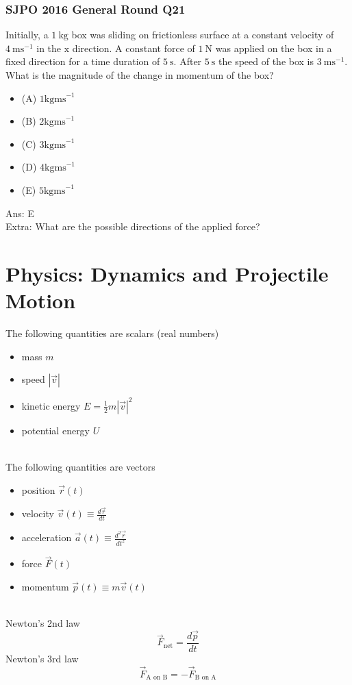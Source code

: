 \documentclass{article}
\begin{document}
\begin{samepage}
\subsubsection{SJPO 2016 General Round Q21}
Initially, a $1\mathrm{~kg}$ box was sliding on frictionless surface at a constant velocity of $4\mathrm{~ms}^{-1}$ in the $\mathrm{x}$ direction. A constant force of $1\mathrm{~N}$ was applied on the box in a fixed direction for a time duration of $5\mathrm{~s}$. After $5\mathrm{~s}$ the speed of the box is $3\mathrm{~ms}^{-1}$. What is the magnitude of the change in momentum of the box?
\begin{itemize}
\item[](A) $1 \mathrm{kgms}^{-1}$
\item[](B) $2 \mathrm{kgms}^{-1}$
\item[](C) $3 \mathrm{kgms}^{-1}$
\item[](D) $4 \mathrm{kgms}^{-1}$
\item[](E) $5 \mathrm{kgms}^{-1}$
\end{itemize}
Ans: E \\[10pt]
Extra: What are the possible directions of the applied force? 
\end{samepage}
\newpage
\section{Physics: Dynamics and Projectile Motion}

The following quantities are scalars (real numbers)
\begin{itemize}
    \item mass $m$
    \item speed $|\vec{v}|$
    \item kinetic energy $E = \frac{1}{2} m|\vec{v}|^2$
    \item potential energy $U$
\end{itemize}
\leavevmode \\
The following quantities are vectors
\begin{itemize}
    \item position $\vec{r}(t)$
    \item velocity $\vec{v}(t) \equiv \frac{d\vec{r}}{dt}$
    \item acceleration $\vec{a}(t) \equiv \frac{d^2\vec{r}}{dt^2}$
    \item force $\vec{F}(t)$
    \item momentum $\vec{p}(t) \equiv m\vec{v}(t)$
\end{itemize}
\leavevmode \\
Newton's 2nd law
$$\vec{F}_{\text{net}} = \frac{d\vec{p}}{dt}$$
Newton's 3rd law 
$$\vec{F}_{\text{A on B}} = -\vec{F}_{\text{B on A}}$$
\end{document}
